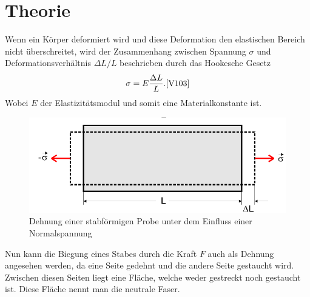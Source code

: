 \section{Theorie}
\label{sec:Theorie}




Wenn ein Körper deformiert wird und diese Deformation den elastischen Bereich nicht überschreitet, wird der Zusammenhang zwischen Spannung $\sigma$ und Deformationsverhältnis $\Delta L / L$ beschrieben durch das Hookesche Gesetz
\begin{equation}
    \sigma = E \frac{\Delta L}{L}.\text{\cite{V103}}
\end{equation}
Wobei $E$ der Elastizitätsmodul und somit eine Materialkonstante ist.
\begin{figure}
    \centering
    \includegraphics[width=\textwidth]{images/skizze_1.png}
    \caption{Dehnung einer stabförmigen Probe unter dem Einfluss einer Normalspannung\cite{V103}}
    \label{skizze_1}
\end{figure}

Nun kann die Biegung eines Stabes durch die Kraft $F$ auch als Dehnung angesehen werden, da eine Seite gedehnt und die andere Seite gestaucht wird. 
Zwischen diesen Seiten liegt eine Fläche, welche weder gestreckt noch gestaucht ist.
Diese Fläche nennt man die neutrale Faser.